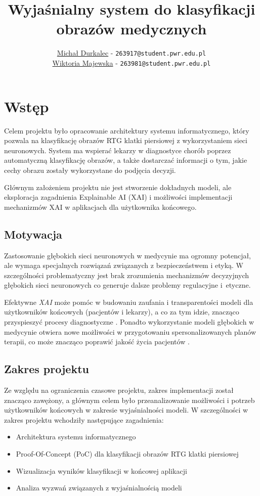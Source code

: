 \documentclass{article}
\title{Wyjaśnialny system do klasyfikacji obrazów medycznych}
\author{\href{mailto:263917@student.pwr.edu.pl}{Michał Durkalec} - \texttt{263917@student.pwr.edu.pl}\\ 
        \href{mailto:263981@student.pwr.edu.pl}{Wiktoria Majewska} - \texttt{263981@student.pwr.edu.pl}}
\date{\vspace{-5ex}} %
\begin{document}
\maketitle
\thispagestyle{firstpage}
\pagestyle{firstpage}

\section{Wstęp}
Celem projektu było opracowanie architektury systemu informatycznego, który pozwala na klasyfikację obrazów RTG klatki piersiowej z wykorzystaniem sieci neuronowych.
System ma wspierać lekarzy w diagnostyce chorób poprzez automatyczną klasyfikację obrazów, a także dostarczać informacji o tym, jakie cechy obrazu zostały wykorzystane do podjęcia decyzji.

Głównym założeniem projektu nie jest stworzenie dokładnych modeli, ale eksploracja zagadnienia Explainable AI (XAI) \cite{gunning2019xai,barredoarrieta2020explainable} i możliwości implementacji mechanizmów XAI w aplikacjach dla użytkownika końcowego.

\subsection{Motywacja}
Zastosowanie głębokich sieci neuronowych w medycynie ma ogromny potencjał, ale wymaga specjalnych rozwiązań związanych z bezpieczeństwem i etyką.
W szczególności problematyczny jest brak zrozumienia mechanizmów decyzyjnych głębokich sieci neuronowych co generuje dalsze problemy regulacyjne i~etyczne. \cite{challen2019artificial}

Efektywne \emph{XAI} może pomóc w budowaniu zaufania i transparentości modeli dla użytkowników końcowych (pacjentów i lekarzy),
a co za tym idzie, znacząco przyspieszyć procesy diagnostyczne \cite{amann2020explainability}.
Ponadto wykorzystanie modeli głębokich w medycynie otwiera nowe możliwości w przygotowaniu spersonalizowanych planów terapii,
co może znacząco poprawić jakość życia pacjentów \cite{allen2024promise}.

\subsection{Zakres projektu}
Ze względu na ograniczenia czasowe projektu, zakres implementacji został znacząco zawężony, a głównym celem było przeanalizowanie możliwości i potrzeb użytkowników końcowych w zakresie wyjaśnialności modeli.
W szczególności w zakres projektu wchodziły następujące zagadnienia:
\begin{itemize}
  \item Architektura systemu informatycznego
  \item Proof-Of-Concept (PoC) dla klasyfikacji obrazów RTG klatki piersiowej
  \item Wizualizacja wyników klasyfikacji w końcowej aplikacji
  \item Analiza wyzwań związanych z wyjaśnialnością modeli
\end{itemize}
\end{document}

